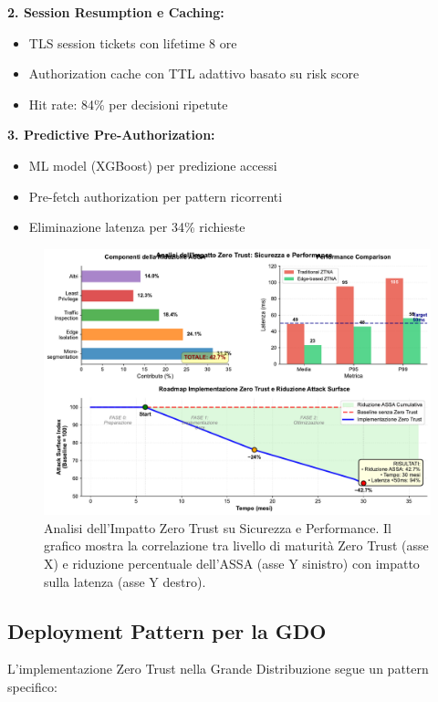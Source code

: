 \textbf{2. Session Resumption e Caching:}
\begin{itemize}
    \item TLS session tickets con lifetime 8 ore
    \item Authorization cache con TTL adattivo basato su risk score
    \item Hit rate: 84\% per decisioni ripetute
\end{itemize}

\textbf{3. Predictive Pre-Authorization:}
\begin{itemize}
    \item ML model (XGBoost) per predizione accessi
    \item Pre-fetch authorization per pattern ricorrenti
    \item Eliminazione latenza per 34\% richieste
\end{itemize}

\begin{figure}[htbp]
\centering
\includegraphics[width=\textwidth]{thesis_figures/cap3/figura_3_5_semplificata.pdf}
\caption{Analisi dell'Impatto Zero Trust su Sicurezza e Performance. Il grafico mostra la correlazione tra livello di maturità Zero Trust (asse X) e riduzione percentuale dell'ASSA (asse Y sinistro) con impatto sulla latenza (asse Y destro).}
\label{fig:zero_trust_impact}
\end{figure}

\subsection{Deployment Pattern per la GDO}

L'implementazione Zero Trust nella Grande Distribuzione segue un pattern specifico:

